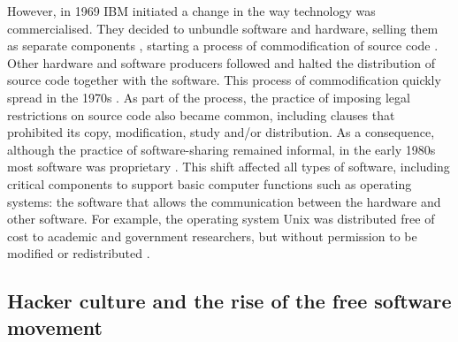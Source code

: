 However, in 1969 IBM initiated a change in the way technology was commercialised. They decided to unbundle software and hardware, selling them as separate components \parencite{ibm:2014:Online}, starting a process of commodification of source code \parencite{deibel2013open, deibel2014open}. Other hardware and software producers followed and halted the distribution of source code together with the software. This process of commodification quickly spread in the 1970s \parencite{fsf-gnu-overview:2014:Online}. As part of the process, the practice of imposing legal restrictions on source code also became common, including clauses that prohibited its copy, modification, study and/or distribution. As a consequence, although the practice of software-sharing remained informal, in the early 1980s most software was proprietary \parencite{fsf-gnu-overview:2014:Online}. This shift affected all types of software, including critical components to support basic computer functions such as operating systems: the software that allows the communication between the hardware and other software. For example, the operating system Unix \parencite{unix:2014:Online} was distributed free of cost to academic and government researchers, but without permission to be modified or redistributed \parencite[128-136]{kelty2008two}.

\subsection{Hacker culture and the rise of the free software movement}
\label{subsec:hacker}

